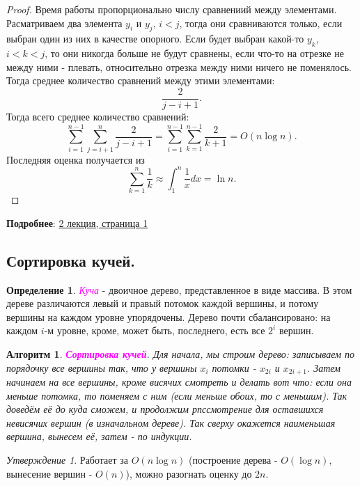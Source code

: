 \documentclass[a4paper]{article}
\theoremstyle{indented}
\newtheorem{alg}{Алгоритм}
\theoremstyle{definition}
\newtheorem{defn}{Определение}
\theoremstyle{remark}
\newtheorem{stat}{Утверждение}
\begin{document}
\begin{proof}
    Время работы пропорционально числу сравнениий между элементами. Расматриваем два элемента $y_i$ и $y_j$, $i<j$, тогда они сравниваются только, если выбран один из них в качестве опорного. Если будет выбран какой-то $y_k$, $i<k<j$, то они никогда больше не будут сравнены, если что-то на отрезке не между ними - плевать, относительно отрезка между ними ничего не поменялось. Тогда среднее количество сравнений между этими элементами: 
    \[
        \frac{2}{j-i+1}. 
    \]
    Тогда всего среднее количество сравнений: 
    \[
        \sum_{i=1}^{n-1}\sum_{j=i+1}^n \frac{2}{j-i+1} = \sum_{i=1}^{n-1}\sum_{k=1}^{n-1} \frac{2}{k+1}= O(n\log n).
    \]
    Последняя оценка получается из
    \[
        \sum_{k=1}^n\frac{1}{k} \approx \int_1^n \frac{1}{x}dx = \ln n. 
    \]
\end{proof}

\textbf{Подробнее}: \href{https://users.math-cs.spbu.ru/~okhotin/teaching/algorithms_2020/okhotin_algorithms_2020_l2.pdf}{2 лекция, страница 1}

\subsection{Сортировка кучей.}

\begin{defn}
    \textcolor{magenta}{\hypertarget{d1.5}{\textit{Куча}}} - двоичное дерево, представленное в виде массива. В этом дереве различаются левый и правый потомок каждой вершины, и потому вершины на каждом уровне упорядочены. Дерево почти сбалансировано: на каждом $i$-м уровне, кроме, может быть, последнего, есть все $2^i$ вершин.
\end{defn}

\begin{alg}
    \textcolor{magenta}{\hypertarget{t2}{\textbf{Сортировка кучей}}}. Для начала, мы строим дерево: записываем по порядочку все вершины так, что у вершины $x_i$ потомки - $x_{2i}$ и $x_{2i+1}$. Затем начинаем на все вершины, кроме висячих смотреть и делать вот что: если она меньше потомка, то поменяем с ним (если меньше обоих, то с меньшим). Так доведём её до куда сможем, и продолжим рпссмотрение для оставшихся невисячих вершин (в изначальном дереве). Так сверху окажется наименьшая вершина, вынесем её, затем - по индукции.
\end{alg}

\begin{stat}
    Работает за $O(n\log n)$ (построение дерева - $O(\log n)$, вынесение вершин - $O(n)$), можно разогнать оценку до $2n$. 
\end{stat}
\end{document}

